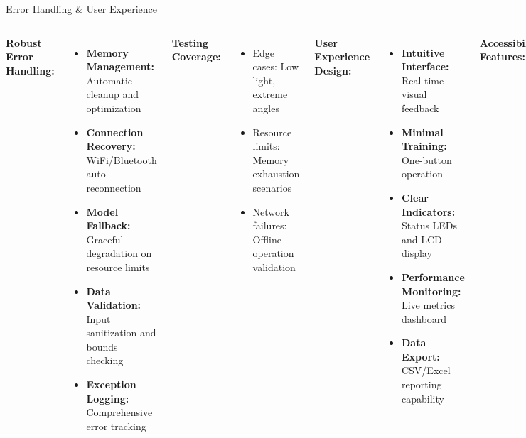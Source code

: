 \documentclass[aspectratio=169]{beamer}
\begin{document}
\begin{frame}{Error Handling \& User Experience}
\begin{columns}
\textbf{Robust Error Handling:}
\begin{itemize}
\item \textbf{Memory Management:} Automatic cleanup and optimization
\item \textbf{Connection Recovery:} WiFi/Bluetooth auto-reconnection
\item \textbf{Model Fallback:} Graceful degradation on resource limits
\item \textbf{Data Validation:} Input sanitization and bounds checking
\item \textbf{Exception Logging:} Comprehensive error tracking
\end{itemize}

\vspace{0.3cm}
\textbf{Testing Coverage:}
\begin{itemize}
\item Edge cases: Low light, extreme angles
\item Resource limits: Memory exhaustion scenarios
\item Network failures: Offline operation validation
\end{itemize}

\textbf{User Experience Design:}
\begin{itemize}
\item \textbf{Intuitive Interface:} Real-time visual feedback
\item \textbf{Minimal Training:} One-button operation
\item \textbf{Clear Indicators:} Status LEDs and LCD display
\item \textbf{Performance Monitoring:} Live metrics dashboard
\item \textbf{Data Export:} CSV/Excel reporting capability
\end{itemize}

\vspace{0.3cm}
\textbf{Accessibility Features:}
\begin{itemize}
\item Multi-language support potential
\item Color-blind friendly indicators
\item Audio feedback options
\end{itemize}
\end{columns}
\end{frame}
\end{document}
